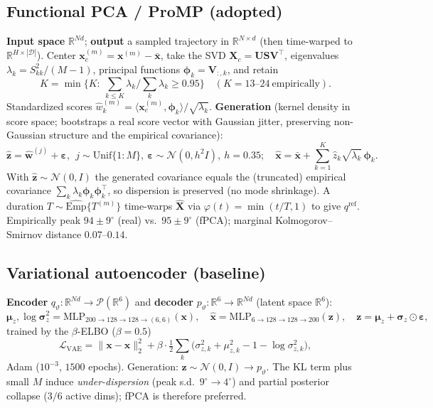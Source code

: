 \documentclass[11pt]{article}
\newcommand{\R}{\mathbb{R}}
\newcommand{\Dset}{\mathcal{D}}
\newcommand{\qref}{q^{\mathrm{ref}}}
\renewcommand{\vec}[1]{\mathbf{#1}}
\begin{document}
\subsection{Functional PCA / ProMP (adopted)}
\textbf{Input space} $\R^{Nd}$; \textbf{output} a sampled trajectory in $\R^{N\times d}$ (then time-warped to $\R^{H\times|\Dset|}$). Center $\vec x_c^{(m)}=\vec x^{(m)}-\bar{\vec x}$, take the SVD $\mathbf X_c=\mathbf U\mathbf S\mathbf V^\top$, eigenvalues $\lambda_k=S_{kk}^2/(M{-}1)$, principal functions $\boldsymbol\phi_k=\mathbf V_{:,k}$, and retain
\begin{equation}
K=\min\Big\{K:\ \textstyle\sum_{k\le K}\lambda_k\big/\sum_k\lambda_k\ge0.95\Big\}\quad(K=13\text{--}24\ \text{empirically}).
\end{equation}
Standardized scores $\hat w^{(m)}_k=\langle\vec x_c^{(m)},\boldsymbol\phi_k\rangle/\sqrt{\lambda_k}$. \textbf{Generation} (kernel density in score space; bootstraps a real score vector with Gaussian jitter, preserving non-Gaussian structure and the empirical covariance):
\begin{equation}
\hat{\vec z}=\hat{\vec w}^{(j)}+\boldsymbol\varepsilon,\ \ j\!\sim\!\mathrm{Unif}\{1{:}M\},\ \boldsymbol\varepsilon\!\sim\!\mathcal N(0,h^2 I),\ h{=}0.35;\quad
\hat{\vec x}=\bar{\vec x}+\sum_{k=1}^{K}\hat z_k\sqrt{\lambda_k}\,\boldsymbol\phi_k.
\end{equation}
With $\hat{\vec z}\!\sim\!\mathcal N(0,I)$ the generated covariance equals the (truncated) empirical covariance $\sum_k\lambda_k\boldsymbol\phi_k\boldsymbol\phi_k^\top$, so dispersion is preserved (no mode shrinkage). A duration $T\!\sim\!\widehat{\mathrm{Emp}}\{T^{(m)}\}$ time-warps $\hat{\vec X}$ via $\varphi(t)=\min(t/T,1)$ to give $\qref$. Empirically peak $94{\pm}9^\circ$ (real) vs.\ $95{\pm}9^\circ$ (fPCA); marginal Kolmogorov--Smirnov distance $0.07$--$0.14$.

\subsection{Variational autoencoder (baseline)}
\textbf{Encoder} $q_\vartheta:\R^{Nd}\to\mathcal P(\R^{6})$ and \textbf{decoder} $p_\vartheta:\R^{6}\to\R^{Nd}$ (latent space $\R^{6}$):
\begin{equation}
\boldsymbol\mu_z,\log\boldsymbol\sigma_z^2=\mathrm{MLP}_{200\to128\to128\to(6,6)}(\vec x),\quad
\hat{\vec x}=\mathrm{MLP}_{6\to128\to128\to200}(\vec z),\quad \vec z=\boldsymbol\mu_z+\boldsymbol\sigma_z\odot\boldsymbol\varepsilon,
\end{equation}
trained by the $\beta$-ELBO ($\beta{=}0.5$)
\begin{equation}
\mathcal L_{\mathrm{VAE}}=\|\vec x-\hat{\vec x}\|_2^2+\beta\cdot\tfrac12\textstyle\sum_k\big(\sigma_{z,k}^2+\mu_{z,k}^2-1-\log\sigma_{z,k}^2\big),
\end{equation}
Adam ($10^{-3}$, $1500$ epochs). Generation: $\vec z\!\sim\!\mathcal N(0,I)\!\to\!p_\vartheta$. The KL term plus small $M$ induce \emph{under-dispersion} (peak s.d.\ $9^\circ\!\to\!4^\circ$) and partial posterior collapse ($3/6$ active dims); fPCA is therefore preferred.
\end{document}
